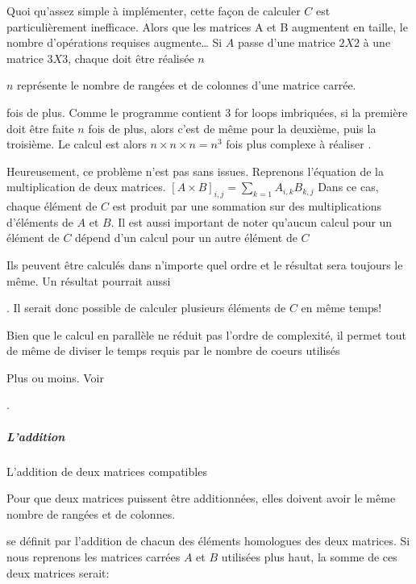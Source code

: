 \documentclass[letterpaper,10pt,french]{sphinxmanual}
\begin{document}
Quoi qu’assez simple à implémenter, cette façon de calculer \(C\) est particulièrement inefficace. Alors que les matrices A et B augmentent en taille, le nombre d’opérations requises augmente… Si \(A\) passe d’une matrice \(2X2\) à une matrice \(3X3\), chaque  doit être réalisée \(n\)%
\begin{footnote}[23]\sphinxAtStartFootnote
\(n\) représente le nombre de rangées et de colonnes d’une matrice carrée.
%
\end{footnote} fois de plus. Comme le programme contient 3 for loops imbriquées, si la première doit être faite \(n\) fois de plus, alors c’est de même pour la deuxième, puis la troisième. Le calcul est alors \(n \times n \times n = n^3\) fois plus complexe à réaliser .

Heureusement, ce problème n’est pas sans issues. Reprenons l’équation de la multiplication de deux matrices.
\([A \times B]_{i,j} = \displaystyle\sum_{k=1}A_{i,k}B_{k,j}\)
Dans ce cas, chaque élément de \(C\) est produit par une sommation sur des multiplications d’éléments de \(A\) et \(B\). Il est aussi important de noter qu’aucun calcul pour un élément de \(C\) dépend d’un calcul pour un autre élément de \(C\)%
\begin{footnote}[24]\sphinxAtStartFootnote
Ils peuvent être calculés dans n’importe quel ordre et le résultat sera toujours le même. Un résultat pourrait aussi
%
\end{footnote}. Il serait donc possible de calculer plusieurs éléments de \(C\) en même temps!

Bien que le calcul en parallèle ne réduit pas l’ordre de complexité, il permet tout de même de diviser le temps requis par le nombre de coeurs utilisés%
\begin{footnote}[25]\sphinxAtStartFootnote
Plus ou moins. Voir 
%
\end{footnote}.


\subparagraph{L’addition}
\label{\detokenize{preprocessing:laddition}}
L’addition de deux matrices compatibles%
\begin{footnote}[26]\sphinxAtStartFootnote
Pour que deux matrices puissent être additionnées, elles doivent avoir le même nombre de rangées et de colonnes.
%
\end{footnote} se définit par l’addition de chacun des éléments homologues des deux matrices. Si nous reprenons les matrices carrées \(A\) et \(B\) utilisées plus haut, la somme de ces deux matrices serait:
\end{document}
